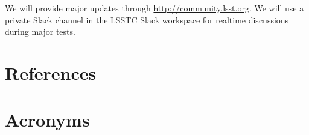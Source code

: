 \documentclass[DM,authoryear,toc]{lsstdoc}
\begin{document}
We will provide major updates through \url{http://community.lsst.org}. 
We will use a private Slack channel in the LSSTC Slack workspace for realtime discussions during major tests.

\appendix
\section{References} \label{sec:bib}
\renewcommand{\refname}{} %


\section{Acronyms} \label{sec:acronyms}

\end{document}
